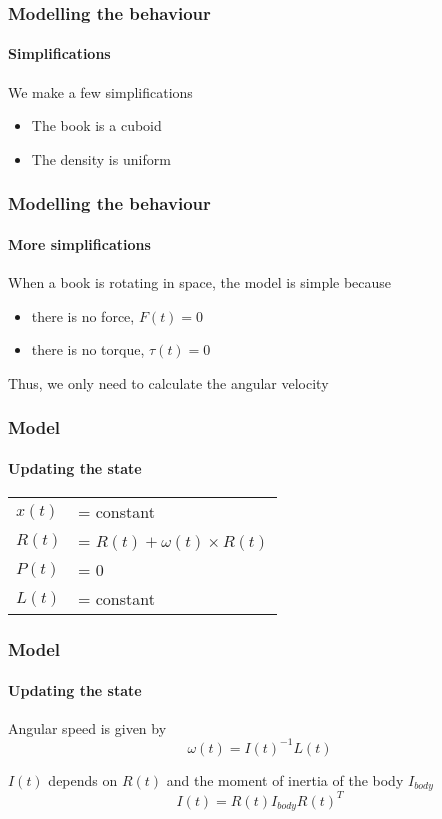 \documentclass{beamer}
\begin{document}
\begin{frame}
 \frametitle{Modelling the behaviour}
 \framesubtitle{Simplifications}
 We make a few simplifications
 \begin{itemize}
  \item The book is a cuboid
  \item The density is uniform
 \end{itemize}
\end{frame}

\begin{frame}
 \frametitle{Modelling the behaviour}
 \framesubtitle{More simplifications}
 When a book is rotating in space, the model is simple because
 \begin{itemize}
  \item there is no force, $F(t) = 0$
  \item there is no torque, $\tau(t) = 0$
 \end{itemize}
 Thus, we only need to calculate the angular velocity
\end{frame}

\begin{frame}
 \frametitle{Model}
 \framesubtitle{Updating the state}
  \begin{table}
  \centering
    \begin{tabular}{ll}
    $x(t)$ & = constant \\
    $R(t)$ & = $R(t) + \omega(t) \times R(t)$\\
    $P(t)$ & = 0 \\
    $L(t)$ & = constant \\ 
    \end{tabular}
  \end{table}

\end{frame}

\begin{frame}
 \frametitle{Model}
 \framesubtitle{Updating the state}
 Angular speed is given by
 \begin{displaymath}
  \omega(t) = I(t)^{-1} L(t)
 \end{displaymath}

 $I(t)$ depends on $R(t)$ and the moment of inertia of the body $I_{body}$
 \begin{displaymath}
  I(t) = R(t) I_{body} R(t)^{T}
 \end{displaymath}
\end{frame}
\end{document}
